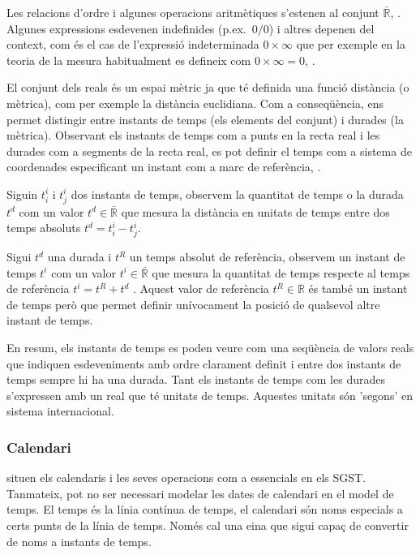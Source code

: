 Les relacions d'ordre i algunes operacions aritmètiques s'estenen al
conjunt $\bar{\mathbb{R}}$, \cite{cantrell:extendedreal}.  Algunes
expressions esdevenen indefinides (p.ex.\ $0/0$) i altres depenen del
context, com és el cas de l'expressió indeterminada $0 \times \infty$ que
per exemple en la teoria de la mesura habitualment es defineix com $0 \times
\infty = 0$, \cite{wiki:extendedreal}.


El conjunt dels reals és un espai mètric ja que té definida una funció
distància (o mètrica), com per exemple la distància euclidiana. Com a
conseqüència, ens permet distingir entre instants de temps (els
elements del conjunt) i durades (la mètrica). Observant els instants
de temps com a punts en la recta real i les durades com a segments de
la recta real, es pot definir el temps com a sistema de coordenades
especificant un instant com a marc de
referència, \parencite{iep:time-supplement,wiki:coordinate}.


\begin{definition}[Temps]
  \label{def:model:temps}
  Siguin $t^i_i$ i $t^i_j$ dos instants de temps, observem la quantitat
  de temps o la durada $t^d$ com un valor $t^d \in\bar{\mathbb{R}}$
  que mesura la distància en unitats de temps entre dos temps
  absoluts $t^d = t^i_i - t^i_j$.
  
  Sigui $t^d$ una durada i $t^{R}$ un temps absolut de referència,
  observem un instant de temps $t^i$ com un valor $t^i
  \in\bar{\mathbb{R}}$ que mesura la quantitat de temps respecte al
  temps de referència $t^i= t^{R} + t^d$ . Aquest valor de referència
  $t^{R}\in\mathbb{R}$ és també un instant de temps però que permet
  definir unívocament la posició de qualsevol altre instant de temps.


\end{definition}

En resum, els instants de temps es poden veure com una seqüència de
valors reals que indiquen esdeveniments amb ordre clarament definit i
entre dos instants de temps sempre hi ha una durada. Tant els instants
de temps com les durades s'expressen amb un real que té unitats de
temps. Aquestes unitats són 'segons' en sistema internacional.



\subsubsection{Calendari}
\textcite{dreyer94} situen els calendaris i les seves operacions com a
essencials en els SGST. Tanmateix, pot no ser necessari modelar les
dates de calendari en el model de temps. El temps és la línia contínua
de temps, el calendari són noms especials a certs punts de la línia de
temps. Només cal una eina que sigui capaç de convertir de noms a
instants de temps.

